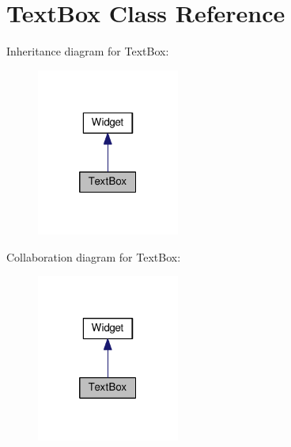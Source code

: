 \hypertarget{class_text_box}{}\section{Text\+Box Class Reference}
\label{class_text_box}


Inheritance diagram for Text\+Box\+:\nopagebreak
\begin{figure}[H]
\begin{center}
\leavevmode
\includegraphics[width=133pt]{class_text_box__inherit__graph}
\end{center}
\end{figure}


Collaboration diagram for Text\+Box\+:\nopagebreak
\begin{figure}[H]
\begin{center}
\leavevmode
\includegraphics[width=133pt]{class_text_box__coll__graph}
\end{center}
\end{figure}
